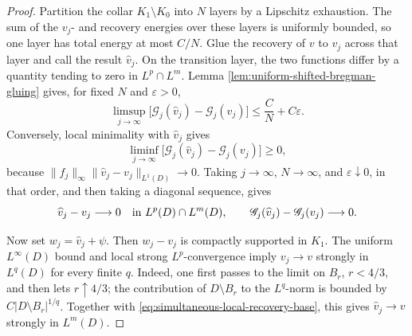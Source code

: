 \documentclass[11pt,reqno]{amsart}
\numberwithin{equation}{section}
\theoremstyle{remark}
\begin{document}
\begin{proof}
Partition the collar \(K_1\setminus K_0\) into \(N\) layers by a
Lipschitz exhaustion.  The sum of the \(v_j\)- and recovery energies
over these layers is uniformly bounded, so one layer has total energy
at most \(C/N\).  Glue the recovery of \(v\) to \(v_j\) across that
layer and call the result \(\widehat v_j\).  On the transition layer,
the two functions differ by a quantity tending to zero in
\(L^p\cap L^m\).  Lemma
\ref{lem:uniform-shifted-bregman-gluing} gives, for fixed
\(N\) and \(\varepsilon>0\),
\[
 \limsup_{j\to\infty}
 \bigl[\mathscr G_j(\widehat v_j)-\mathscr G_j(v_j)\bigr]
 \le\frac CN+C\varepsilon.
\]
Conversely, local minimality with \(\widehat v_j\) gives
\[
 \liminf_{j\to\infty}
 \bigl[\mathscr G_j(\widehat v_j)-\mathscr G_j(v_j)\bigr]\ge0,
\]
because
\(\|f_j\|_\infty\|\widehat v_j-v_j\|_{L^1(D)}\to0\).
Taking \(j\to\infty\), \(N\to\infty\), and
\(\varepsilon\downarrow0\), in that order, and then taking a diagonal
sequence, gives
\begin{equation}
 \widehat v_j-v_j\longrightarrow0
 \quad\hbox{in }L^p(D)\cap L^m(D),\qquad
 \mathscr G_j(\widehat v_j)-\mathscr G_j(v_j)\longrightarrow0.
 \label{eq:simultaneous-local-recovery-base}
\end{equation}

Now set \(w_j=\widehat v_j+\psi\).  Then \(w_j-v_j\) is compactly
supported in \(K_1\).  The uniform \(L^\infty(D)\) bound and local strong
\(L^p\)-convergence imply \(v_j\to v\) strongly in \(L^q(D)\) for every
finite \(q\).  Indeed, one first passes to the limit on \(B_r\),
\(r<4/3\), and then lets \(r\uparrow4/3\); the contribution of
\(D\setminus B_r\) to the \(L^q\)-norm is bounded by
\(C|D\setminus B_r|^{1/q}\).  Together with
\eqref{eq:simultaneous-local-recovery-base}, this gives
\(\widehat v_j\to v\) strongly in \(L^m(D)\).


\end{proof}
\end{document}
